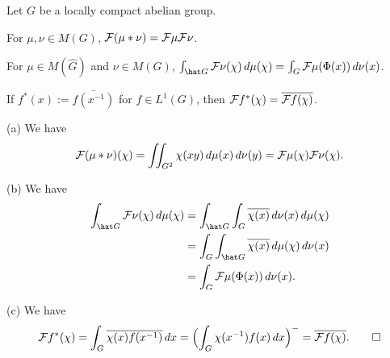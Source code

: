 \documentclass[a4paper]{article}
\begin{document}
\begin{prop}
Let $G$ be a locally compact abelian group.
\begin{parts}
\item For $\mu,\nu\in M(G)$, $\mathcal{F}(\mu*\nu)=\mathcal{F}\mu\mathcal{F}\nu$.
\item For $\mu\in M(\hat G)$ and $\nu\in M(G)$, $\int_{\hat G}\cF \nu(\chi)\,d\mu(\chi)=\int_G\cF\mu(\Phi(x))\,d\nu(x)$.
\item If $f^*(x):=\bar{f(x^{-1})}$ for $f\in L^1(G)$, then $\mathcal{F} f^*(\chi)=\overline{\mathcal{F} f(\chi)}$.
\end{parts}
\end{prop}
\begin{pf}
(a)
We have
\[\mathcal{F}(\mu*\nu)(\chi)=\iint_{G^2}\chi(xy)\,d\mu(x)\,d\nu(y)=\mathcal{F}\mu(\chi)\mathcal{F}\nu(\chi).\]

(b)
We have
\begin{align*}
\int_{\hat G}\cF \nu(\chi)\,d\mu(\chi)
&=\int_{\hat G}\int_G\bar{\chi(x)}\,d\nu(x)\,d\mu(\chi)\\
&=\int_G\int_{\hat G}\bar{\chi(x)}\,d\mu(\chi)\,d\nu(x)\\
&=\int_G\cF\mu(\Phi(x))\,d\nu(x).
\end{align*}

(c)
We have
\[\mathcal{F} f^*(\chi)=\int_G\overline{\chi(x)}\overline{f(x^{-1})}\,dx=\Bigl(\int_G\chi(x^{-1})f(x)\,dx\Bigr)^-=\overline{\mathcal{F} f(\chi)}.\qedhere\]
\end{pf}
\end{document}
